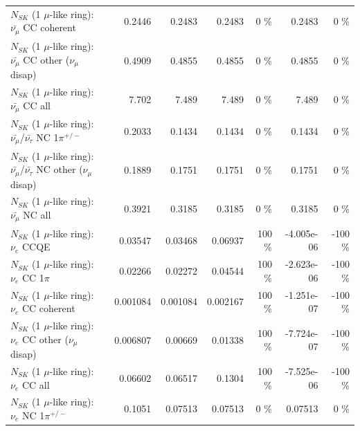 \begin{table}
\begin{tabular}{| l | r | r | r  r | r  r |}
                       $N_{SK}$ (1 $\mu$-like ring): $\bar{\nu_\mu}$ CC coherent &          0.2446 &          0.2483 &          0.2483 &        0 \%  &          0.2483 &        0 \%  \\ 
        $N_{SK}$ (1 $\mu$-like ring): $\bar{\nu_\mu}$ CC other ($\nu_\mu$ disap) &          0.4909 &          0.4855 &          0.4855 &        0 \%  &          0.4855 &        0 \%  \\ 
                          $N_{SK}$ (1 $\mu$-like ring): $\bar{\nu_{\mu}}$ CC all &           7.702 &           7.489 &           7.489 &        0 \%  &           7.489 &        0 \%  \\ 
\hline
  $N_{SK}$ (1 $\mu$-like ring): $\bar{\nu_\mu}$/$\bar{\nu_\tau}$ NC 1$\pi^{+/-}$ &          0.2033 &          0.1434 &          0.1434 &        0 \%  &          0.1434 &        0 \%  \\ 
$N_{SK}$ (1 $\mu$-like ring): $\bar{\nu_\mu}$/$\bar{\nu_\tau}$ NC other ($\nu_\mu$ disap) &          0.1889 &          0.1751 &          0.1751 &        0 \%  &          0.1751 &        0 \%  \\ 
                          $N_{SK}$ (1 $\mu$-like ring): $\bar{\nu_{\mu}}$ NC all &          0.3921 &          0.3185 &          0.3185 &        0 \%  &          0.3185 &        0 \%  \\ 
\hline
\hline
\hline
                                      $N_{SK}$ (1 $\mu$-like ring): $\nu_e$ CCQE &         0.03547 &         0.03468 &         0.06937 &      100 \%  &      -4.005e-06 &     -100 \%  \\ 
                                 $N_{SK}$ (1 $\mu$-like ring): $\nu_e$ CC 1$\pi$ &         0.02266 &         0.02272 &         0.04544 &      100 \%  &      -2.623e-06 &     -100 \%  \\ 
                               $N_{SK}$ (1 $\mu$-like ring): $\nu_e$ CC coherent &        0.001084 &        0.001084 &        0.002167 &      100 \%  &      -1.251e-07 &     -100 \%  \\ 
                $N_{SK}$ (1 $\mu$-like ring): $\nu_e$ CC other ($\nu_\mu$ disap) &        0.006807 &         0.00669 &         0.01338 &      100 \%  &      -7.724e-07 &     -100 \%  \\ 
                                  $N_{SK}$ (1 $\mu$-like ring): $\nu_{e}$ CC all &         0.06602 &         0.06517 &          0.1304 &      100 \%  &      -7.525e-06 &     -100 \%  \\ 
\hline
                           $N_{SK}$ (1 $\mu$-like ring): $\nu_e$ NC 1$\pi^{+/-}$ &          0.1051 &         0.07513 &         0.07513 &        0 \%  &         0.07513 &        0 \%  \\ 

\end{tabular}
\end{table}
